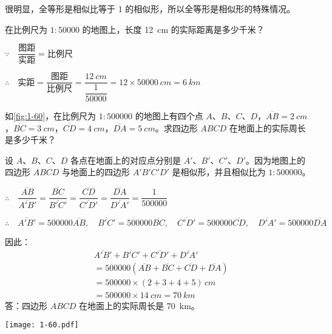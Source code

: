很明显，全等形是相似比等于 1 的相似形，所以全等形是相似形的特殊情况。

\begin{example}
在比例尺为 $1:50000$ 的地图上，长度 \qty{12}{cm} 的实际距离是多少千米？
\end{example}

\begin{solution}
$\because\quad \dfrac{\text{图距}}{\text{实距}}=\text{比例尺}$

$\therefore\quad \text{实距}=\dfrac{\text{图距}}{\text{比例尺}}=\dfrac{\qty{12}{cm}}{\dfrac{1}{50000}}=12\times \qty{50000}{cm}=\qty{6}{km}$
\end{solution}

\begin{example}
如\cref{fig:1-60}，在比例尺为 $1:500000$ 的地图上有四个点 $A$、$B$、$C$、$D$，$\overline{AB}=\qty{2}{cm}$，$\overline{BC}=\qty{3}{cm}$，$\overline{CD}=\qty{4}{cm}$，$\overline{DA}=\qty{5}{cm}$。求四边形 $ABCD$ 在地面上的实际周长是多少千米？
\end{example}

\noindent
\begin{minipage}{0.7\linewidth}
	\begin{solution}
		设 $A$、$B$、$C$、$D$ 各点在地面上的对应点分别是 $A'$、$B'$、$C'$、$D'$。因为地图上的四边形 $ABCD$ 与地面上的四边形 $A'B'C'D'$ 是相似形，并且相似比为 $1:500000$。
		
		$\therefore\quad \dfrac{\overline{AB}}{\overline{A'B'}}=\dfrac{\overline{BC}}{\overline{B'C'}}=\dfrac{\overline{CD}}{\overline{C'D'}}=\dfrac{\overline{DA}}{\overline{D'A'}}=\dfrac{1}{500000}$
		
		\medskip
		$\therefore\quad \overline{A'B'}=500000\overline{AB},\quad \overline{B'C'}=500000\overline{BC},\quad \overline{C'D'}=500000\overline{CD},\quad \overline{D'A'}=500000\overline{DA}$
		
		因此：
		\[\begin{split}
			&\overline{A'B'}+\overline{B'C'}+\overline{C'D'}+\overline{D'A'}\\
			&=500000\left(\overline{AB}+\overline{BC}+\overline{CD}+\overline{DA}\right)\\
			&=500000\times(2+3+4+5) \,\unit{cm}\\
			&=500000\times \qty{14}{cm}=\qty{70}{km}
		\end{split}\]
		答：四边形 $ABCD$ 在地面上的实际周长是 \qty{70}{km}。
	\end{solution}
\end{minipage}%
\begin{minipage}{0.3\linewidth}\centering
	\begin{figurehere}
		\texttt{[image: 1-60.pdf]}
		\caption{}\label{fig:1-60}
	\end{figurehere}
\end{minipage}

